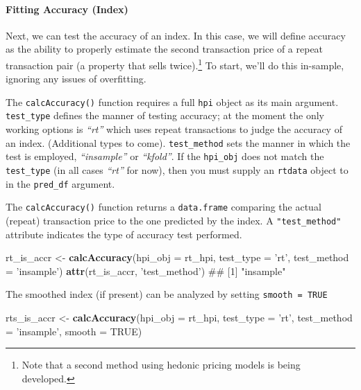 \documentclass[]{article}
\newenvironment{Shaded}{\begin{snugshade}}{\end{snugshade}}
\newcommand{\DataTypeTok}[1]{\textcolor[rgb]{0.13,0.29,0.53}{#1}}
\newcommand{\KeywordTok}[1]{\textcolor[rgb]{0.13,0.29,0.53}{\textbf{#1}}}
\newcommand{\NormalTok}[1]{#1}
\newcommand{\OtherTok}[1]{\textcolor[rgb]{0.56,0.35,0.01}{#1}}
\newcommand{\StringTok}[1]{\textcolor[rgb]{0.31,0.60,0.02}{#1}}
\let\oldparagraph\paragraph
\renewcommand{\paragraph}[1]{\oldparagraph{#1}\mbox{}}
\let\rmarkdownfootnote\footnote%
\def\footnote{\protect\rmarkdownfootnote}
\begin{document}
\hypertarget{fitting-accuracy-index}{%
\paragraph{Fitting Accuracy (Index)}\label{fitting-accuracy-index}}

Next, we can test the accuracy of an index. In this case, we will define
accuracy as the ability to properly estimate the second transaction
price of a repeat transaction pair (a property that sells
twice).\footnote{Note that a second method using hedonic pricing models
  is being developed.} To start, we'll do this in-sample, ignoring any
issues of overfitting.

The \texttt{calcAccuracy()} function requires a full \texttt{hpi} object
as its main argument. \texttt{test\_type} defines the manner of testing
accuracy; at the moment the only working options is \emph{``rt''} which
uses repeat transactions to judge the accuracy of an index. (Additional
types to come). \texttt{test\_method} sets the manner in which the test
is employed, \emph{``insample''} or \emph{``kfold''}. If the
\texttt{hpi\_obj} does not match the \texttt{test\_type} (in all cases
\emph{``rt''} for now), then you must supply an \texttt{rtdata} object
to in the \texttt{pred\_df} argument.

The \texttt{calcAccuracy()} function returns a \texttt{data.frame}
comparing the actual (repeat) transaction price to the one predicted by
the index. A \texttt{"test\_method"} attribute indicates the type of
accuracy test performed.

\begin{Shaded}
\begin{Highlighting}[]
\NormalTok{   rt_is_accr <-}\StringTok{ }\KeywordTok{calcAccuracy}\NormalTok{(}\DataTypeTok{hpi_obj =}\NormalTok{ rt_hpi,}
                              \DataTypeTok{test_type =} \StringTok{'rt'}\NormalTok{,}
                              \DataTypeTok{test_method =} \StringTok{'insample'}\NormalTok{)}
   \KeywordTok{attr}\NormalTok{(rt_is_accr, }\StringTok{'test_method'}\NormalTok{)}
\NormalTok{## [1] "insample"}
\end{Highlighting}
\end{Shaded}

The smoothed index (if present) can be analyzed by setting
\texttt{smooth\ =\ TRUE}

\begin{Shaded}
\begin{Highlighting}[]
\NormalTok{    rts_is_accr <-}\StringTok{ }\KeywordTok{calcAccuracy}\NormalTok{(}\DataTypeTok{hpi_obj =}\NormalTok{ rt_hpi,}
                                \DataTypeTok{test_type =} \StringTok{'rt'}\NormalTok{,}
                                \DataTypeTok{test_method =} \StringTok{'insample'}\NormalTok{,}
                                \DataTypeTok{smooth =} \OtherTok{TRUE}\NormalTok{)}
\end{Highlighting}
\end{Shaded}
\end{document}
